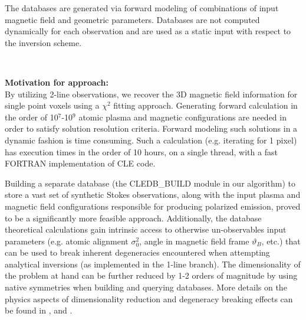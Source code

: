 \documentclass{article}
\begin{document}
The databases are generated via forward modeling of combinations of input magnetic field and geometric parameters.  Databases are not computed dynamically for each observation and are used as a static input with respect to the inversion scheme.

~

\textbf{Motivation for approach:\\}
By utilizing 2-line observations, we recover the 3D magnetic field information for single point voxels using a $\chi^2$ fitting approach. Generating forward calculation in the order of 10$^7$-10$^9$ atomic plasma and magnetic configurations are needed in order to satisfy solution resolution criteria. Forward modeling such solutions in a dynamic fashion is time consuming. Such a calculation (e.g. iterating for 1 pixel) has execution times in the order of 10 hours, on a single thread, with a fast FORTRAN implementation of CLE code. 

Building a separate database (the CLEDB\_BUILD module in our algorithm) to store a vast set of synthetic Stokes observations, along with the input plasma and magnetic field configurations responsible for producing polarized emission, proved to be a significantly more feasible approach. Additionally, the database theoretical calculations gain intrinsic access to otherwise un-observables input parameters (e.g. atomic alignment $\sigma_0^2$, angle in magnetic field frame $\vartheta_B$, etc.) that can be used to break inherent degeneracies encountered when attempting analytical inversions (as implemented in the 1-line branch). The dimensionality of the problem at hand can be further reduced by 1-2 orders of magnitude by using native symmetries when building and querying databases. More details on the physics aspects of dimensionality reduction and degeneracy breaking effects can be found in \citet{2020ApJ...889..109D,2021ApJ...912...18J}, \citet{schiffmann2021} and \citet{par2022}.

\newpage
\end{document}
